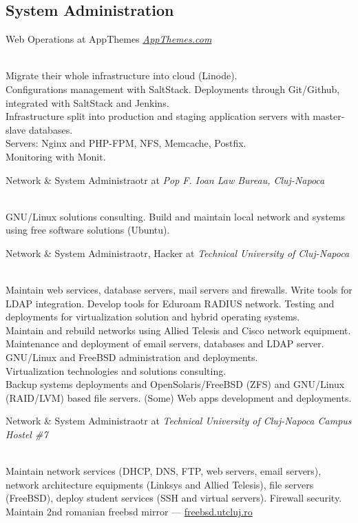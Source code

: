 \documentclass[10pt, a4paper]{article}
\newcommand{\years}[1]{\marginnote{\scriptsize #1}}
\begin{document}
\subsection*{System Administration}
\noindent

\years{2012 Autumn}Web Operations at AppThemes \emph{\href{http://appthemes.com/about}{AppThemes.com}}
\begin{footnotesize}
\\
Migrate their whole infrastructure into cloud (Linode).\\
Configurations management with SaltStack. Deployments through Git/Github, integrated with SaltStack and Jenkins.\\
Infrastructure split into production and staging application servers with master-slave databases.\\
Servers: Nginx and PHP-FPM, NFS, Memcache, Postfix.\\
Monitoring with Monit.
\end{footnotesize}

\years{2009-2012}Network \& System Administraotr at \emph{Pop F. Ioan Law Bureau, Cluj-Napoca}
\begin{footnotesize}
\\
GNU/Linux solutions consulting. Build and maintain local network and systems using free software solutions (Ubuntu).
\end{footnotesize}

\years{2008-2009}Network \& System Administraotr, Hacker at \emph{Technical University of Cluj-Napoca}
\begin{footnotesize}
\\
Maintain web services, database servers, mail servers and firewalls. Write tools for LDAP integration. Develop tools for Eduroam RADIUS network. Testing and deployments for virtualization solution and hybrid operating systems.\\
Maintain and rebuild networks using Allied Telesis and Cisco network equipment. Maintenance and deployment of email servers, databases and LDAP server.\\
GNU/Linux and FreeBSD administration and deployments.\\
Virtualization technologies and solutions consulting.\\
Backup systems deployments and OpenSolaris/FreeBSD (ZFS) and GNU/Linux (RAID/LVM) based file servers. (Some) Web apps development and deployments.
\end{footnotesize}

\years{2008-2009}Network \& System Administraotr at \emph{Technical University of Cluj-Napoca Campus Hostel \#7}
\begin{footnotesize}
\\
Maintain network services (DHCP, DNS, FTP, web servers, email servers), network architecture equipments (Linksys and Allied Telesis), file servers (FreeBSD), deploy student services (SSH and virtual servers). Firewall security.\\
Maintain 2nd romanian freebsd mirror --- \href{http://freebsd.utcluj.ro}{freebsd.utcluj.ro}
\end{footnotesize}
\end{document}
